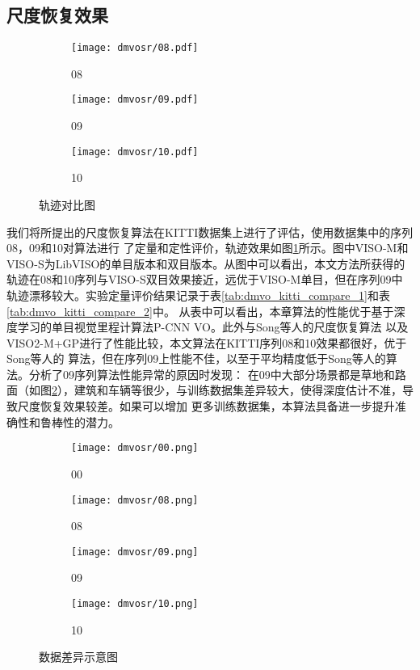 \subsection{尺度恢复效果}
\label{sec:deepsr_exp_vo}
\begin{figure}
    \centering
    \begin{subfigure}[c]{0.32\textwidth}
        \texttt{[image: dmvosr/08.pdf]}
        \caption{08}
    \end{subfigure}
    \begin{subfigure}[c]{0.32\textwidth}
        \texttt{[image: dmvosr/09.pdf]}
        \caption{09}
    \end{subfigure}
    \begin{subfigure}[c]{0.32\textwidth}
        \texttt{[image: dmvosr/10.pdf]}
        \caption{10}
    \end{subfigure}
    \caption{轨迹对比图}
    \label{fig:dmvosr_path}
\end{figure}

我们将所提出的尺度恢复算法在KITTI数据集上进行了评估，使用数据集中的序列08，09和10对算法进行
了定量和定性评价，轨迹效果如图\ref{fig:dmvosr_path}所示。图中VISO-M和VISO-S为LibVISO\cite{Kitt2010IV}的单目版本和双目版本。从图中可以看出，本文方法所获得的轨迹在08和10序列与VISO-S双目效果接近，远优于VISO-M单目，但在序列09中轨迹漂移较大。实验定量评价结果记录于表\ref{tab:dmvo_kitti_compare_1}和表\ref{tab:dmvo_kitti_compare_2}中。
从表中可以看出，本章算法的性能优于基于深度学习的单目视觉里程计算法P-CNN VO。此外与Song等人\cite{Song2015MoncularScale}的尺度恢复算法
以及VISO2-M+GP\cite{Song2015MoncularScale}进行了性能比较，本文算法在KITTI序列08和10效果都很好，优于Song等人的
算法，但在序列09上性能不佳，以至于平均精度低于Song等人的算法。分析了09序列算法性能异常的原因时发现：
在09中大部分场景都是草地和路面（如图\ref{fig:dmvosr_data_diff}），建筑和车辆等很少，与训练数据集差异较大，使得深度估计不准，导致尺度恢复效果较差。如果可以增加
更多训练数据集，本算法具备进一步提升准确性和鲁棒性的潜力。

\begin{figure}[h]
    \centering
    \begin{subfigure}[c]{0.48\textwidth}
        \texttt{[image: dmvosr/00.png]}
        \caption{00}
    \end{subfigure}
    \vspace*{2mm}
    \begin{subfigure}[c]{0.48\textwidth}
        \texttt{[image: dmvosr/08.png]}
        \caption{08}
    \end{subfigure}
    \vspace*{2mm}
    \begin{subfigure}[c]{0.48\textwidth}
        \texttt{[image: dmvosr/09.png]}
        \caption{09}
    \end{subfigure}
    \begin{subfigure}[c]{0.48\textwidth}
        \texttt{[image: dmvosr/10.png]}
        \caption{10}
    \end{subfigure}
    \caption{数据差异示意图}
    \label{fig:dmvosr_data_diff}
\end{figure}



